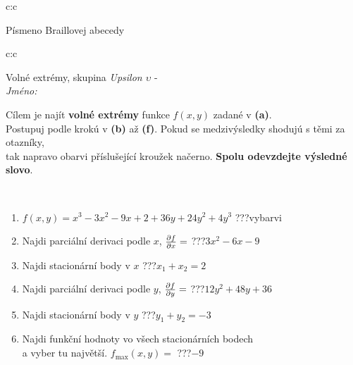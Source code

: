 \documentclass[10pt]{report}
\begin{document}
\begin{tabular}{c:c}
\begin{minipage}[c][104.5mm][t]{0.5\linewidth}
\begin{center}
\begin{minipage}{0.20\linewidth}
\begin{center}
{\small Písmeno Braillovej abecedy}
\end{center}
\end{minipage}
\end{center}
\end{minipage}
%
\end{tabular}
\newpage
\thispagestyle{empty}
\begin{tabular}{c:c}
\begin{minipage}[c][104.5mm][t]{0.5\linewidth}
\begin{center}
\vspace{7mm}
{\huge Volné extrémy, skupina \textit{Upsilon $\upsilon$} -}\\[5mm]
\textit{Jméno:}\phantom{xxxxxxxxxxxxxxxxxxxxxxxxxxxxxxxxxxxxxxxxxxxxxxxxxxxxxxxxxxxxxxxxx}\\[5mm]
\begin{minipage}{0.95\linewidth}
\begin{center}
Cílem je najít \textbf{volné extrémy} funkce $f(x,y)$ zadané v \textbf{(a)}.\\Postupuj podle krokú v \textbf{(b)} až \textbf{(f)}. Pokud se medzivýsledky shodujú s těmi za otazníky,\\tak napravo obarvi příslušející kroužek načerno. \textbf{Spolu odevzdejte výsledné slovo}.
\end{center}
\end{minipage}
\\[1mm]
\begin{minipage}{0.79\linewidth}
\begin{center}
\begin{varwidth}{\linewidth}
\begin{enumerate}
\normalsize
\item $f(x,y)=x^3-3x^2-9x+2+36y+24y^2+4y^3$\quad \dotfill\; ???\;\dotfill \quad vybarvi
\item Najdi parciální derivaci podle $x$, $\pdv{f}{x}=$\quad \dotfill\; ???\;\dotfill \quad $3x^2-6x-9$
\item Najdi stacionární body v $x$\quad \dotfill\; ???\;\dotfill \quad $x_1+x_2=2$
\item Najdi parciální derivaci podle $y$, $\pdv{f}{y}=$\quad \dotfill\; ???\;\dotfill \quad $12y^2+48y+36$
\item Najdi stacionární body v $y$\quad \dotfill\; ???\;\dotfill \quad $y_1+y_2=-3$
\item Najdi funkční hodnoty vo všech stacionárních bodech \\ \phantom{xxxxxx} a vyber tu najvětší. $f_{\text{max}}(x,y)=$\quad \dotfill\; ???\;\dotfill \quad $-9$

\end{enumerate}
\end{varwidth}
\end{center}
\end{minipage}
\end{center}
\end{minipage}
\end{tabular}
\end{document}
